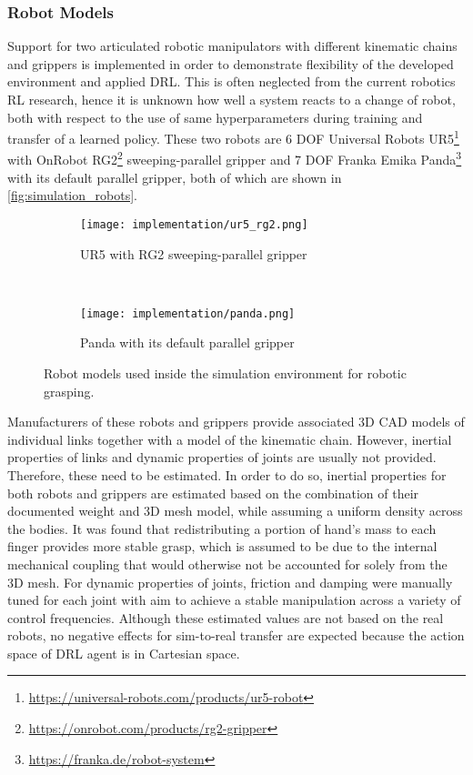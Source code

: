 \subsubsection{Robot Models}

Support for two articulated robotic manipulators with different kinematic chains and grippers is implemented in order to demonstrate flexibility of the developed environment and applied DRL. This is often neglected from the current robotics RL research, hence it is unknown how well a system reacts to a change of robot, both with respect to the use of same hyperparameters during training and transfer of a learned policy. These two robots are 6 DOF Universal Robots UR5\footnote{\href{https://universal-robots.com/products/ur5-robot}{https://universal-robots.com/products/ur5-robot}} with OnRobot RG2\footnote{\href{https://onrobot.com/products/rg2-gripper}{https://onrobot.com/products/rg2-gripper}} sweeping-parallel gripper and 7 DOF Franka Emika Panda\footnote{\href{https://franka.de/robot-system}{https://franka.de/robot-system}} with its default parallel gripper, both of which are shown in \autoref{fig:simulation_robots}.

\begin{figure}[ht]
    \centering
    \begin{subfigure}[ht]{0.4975\textwidth}
        \centering
        \texttt{[image: implementation/ur5\_rg2.png]}
        \caption*{UR5 with RG2 sweeping-parallel gripper}
    \end{subfigure}%
    ~%
    \begin{subfigure}[ht]{0.4975\textwidth}
        \centering
        \texttt{[image: implementation/panda.png]}
        \caption*{Panda with its default parallel gripper}
    \end{subfigure}%
    \caption{Robot models used inside the simulation environment for robotic grasping.}
    \label{fig:simulation_robots}
\end{figure}

Manufacturers of these robots and grippers provide associated 3D CAD models of individual links together with a model of the kinematic chain. However, inertial properties of links and dynamic properties of joints are usually not provided. Therefore, these need to be estimated. In order to do so, inertial properties for both robots and grippers are estimated based on the combination of their documented weight and 3D mesh model, while assuming a uniform density across the bodies. It was found that redistributing a portion of hand's mass to each finger provides more stable grasp, which is assumed to be due to the internal mechanical coupling that would otherwise not be accounted for solely from the 3D mesh. For dynamic properties of joints, friction and damping were manually tuned for each joint with aim to achieve a stable manipulation across a variety of control frequencies. Although these estimated values are not based on the real robots, no negative effects for sim-to-real transfer are expected because the action space of DRL agent is in Cartesian space.

